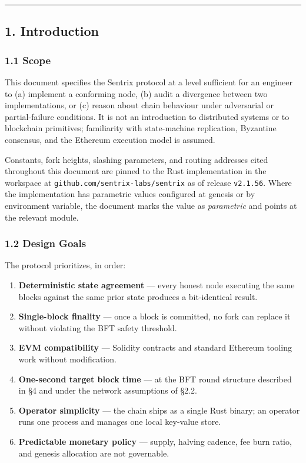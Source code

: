 \documentclass[11pt,a4paper]{article}
\providecommand{\tightlist}{\setlength{\itemsep}{0pt}\setlength{\parskip}{0pt}}
\begin{document}
\begin{center}\rule{0.5\linewidth}{0.5pt}\end{center}

\hypertarget{1-introduction}{%
\subsection{1. Introduction}\label{1-introduction}}

\hypertarget{11-scope}{%
\subsubsection{1.1 Scope}\label{11-scope}}

This document specifies the Sentrix protocol at a level sufficient for
an engineer to (a) implement a conforming node, (b) audit a divergence
between two implementations, or (c) reason about chain behaviour under
adversarial or partial-failure conditions. It is not an introduction to
distributed systems or to blockchain primitives; familiarity with
state-machine replication, Byzantine consensus, and the Ethereum
execution model is assumed.

Constants, fork heights, slashing parameters, and routing addresses
cited throughout this document are pinned to the Rust implementation in
the workspace at \texttt{github.com/sentrix-labs/sentrix} as of release
\texttt{v2.1.56}. Where the implementation has parametric values
configured at genesis or by environment variable, the document marks the
value as \emph{parametric} and points at the relevant module.

\hypertarget{12-design-goals}{%
\subsubsection{1.2 Design Goals}\label{12-design-goals}}

The protocol prioritizes, in order:

\begin{enumerate}
\def\labelenumi{\arabic{enumi}.}
\tightlist
\item
  \textbf{Deterministic state agreement} --- every honest node executing
  the same blocks against the same prior state produces a bit-identical
  result.
\item
  \textbf{Single-block finality} --- once a block is committed, no fork
  can replace it without violating the BFT safety threshold.
\item
  \textbf{EVM compatibility} --- Solidity contracts and standard
  Ethereum tooling work without modification.
\item
  \textbf{One-second target block time} --- at the BFT round structure
  described in §4 and under the network assumptions of §2.2.
\item
  \textbf{Operator simplicity} --- the chain ships as a single Rust
  binary; an operator runs one process and manages one local key-value
  store.
\item
  \textbf{Predictable monetary policy} --- supply, halving cadence, fee
  burn ratio, and genesis allocation are not governable.
\end{enumerate}
\end{document}
